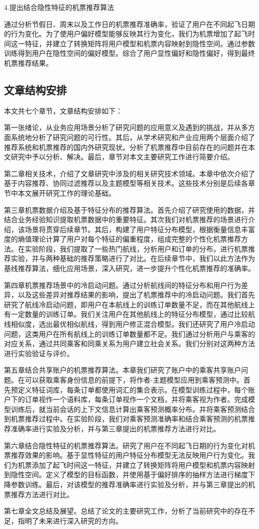 4.提出结合隐性特征的机票推荐算法

通过分析节假日、周末以及工作日的机票推荐准确率，验证了用户在不同起飞日期的行为变化。为了使用户偏好模型能够反映其行为变化，我们为机票增加了起飞时间这一特征，并建立了转换矩阵将用户模型和机票内容映射到隐性空间。通过参数训练得到用户在隐性空间的偏好模型。综合了用户显性偏好和隐性偏好，得到最终机票推荐结果。


\subsection{文章结构安排}
本文共七个章节，文章结构安排如下：

第一张绪论，从业务应用场景分析了研究问题的应用意义及遇到的挑战，并从多方面系统地分析了研究问题的可行性。其后，从学术研究和产业应用两个层面介绍了推荐系统和机票推荐的国内外研究现状。分析了机票推荐中目前存在的问题并在本文研究中予以分析、解决。最后，章节对本文主要研究工作进行简要介绍。

第二章相关技术，介绍了文章研究中涉及的相关研究技术领域。本章中依次介绍了基于内容推荐、协同过滤推荐以及主题模型等相关技术。这些技术分别是后续各章节中本文展开研究工作的理论基础。

第三章机票数据介绍及基于特征分布的推荐算法。首先介绍了研究使用的数据，并结合业务经验知识提取机票数据中的重要特征。其次我们对机票推荐的场景进行介绍，该场景将贯穿后续章节。其后，构建了用户特征分布模型，根据衡量信息丰富度的熵值理论计算了用户对每个特征的偏重程度，组成完整的个性化机票推荐方法。在实验阶段，我们提取了一些热门航线，分析用户和订单的分布，进行机票推荐实验，并与两种基础的推荐策略进行了对比。在后续章节中，我们以此方法作为基线推荐算法，细化应用场景，深入研究，进一步提升个性化机票推荐的准确率。

第四章机票推荐场景中的冷启动问题。通过分析航线间的特征分布和用户行为差异，以及这些差异对推荐结果的影响，提出了机票推荐中的冷启动问题。我们首先研究了航线冷启动问题，即用户在本航线上的训练订单数量不足，而在其他航线上有一定数量的训练订单。我们关注用户在其他航线上的特征分布模型，通过比较航线相似度，选出最优相似航线，得到用户修正混合模型。我们还研究了用户冷启动问题，这类用户在所有航线上的训练订单数量都不足。我们通过分析用户与乘客的对应关系，通过共同乘客和同乘关系为用户建立社会关系。我们分别对这两种方法进行实验验证与评价。

第五章结合共享账户的机票推荐算法。本章我们研究了账户中的乘客共享账户问题。在可以获取乘客身份信息的前提下，将作者-主题模型应用到乘客预测中。首先预定义特征词库，每条订单都使用词汇的集合表示。在模型训练过程中，每个账户下的订单视作一个语料库，每条订单视作一个文档，并将乘客视为作者。完成模型训练后，就当前会话的上下文信息计算出乘客预测概率分布。并将乘客预测结合到机票推荐过程中。在实验阶段，我们对乘客预测准确率和结合乘客预测的机票推荐准确率进行实验及分析，并与第三章提出的机票推荐方法进行对比。

第六章结合隐性特征的机票推荐算法。研究了用户在不同起飞日期的行为变化对机票推荐效果的影响。基于显性特征的用户特征分布模型无法反映用户行为变化。我们为机票添加了起飞时间这一特征，并建立了转换矩阵将用户模型和机票内容映射到隐性空间。定义了模型的目标函数，并使用基于偏好排序的抽样方法进行梯度下降参数训练。最后，对该模型的推荐准确率进行实验及分析，并与第三章提出的机票推荐方法进行对比。

第七章全文总结及展望。总结了论文的主要研究工作，分析了当前研究中的存在不足，指明了未来进行深入研究的方向。